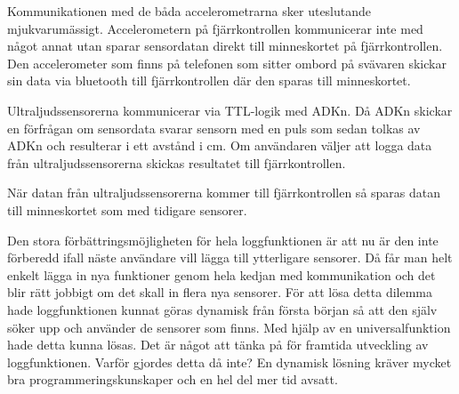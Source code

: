 Kommunikationen med de båda accelerometrarna sker uteslutande mjukvarumässigt. Accelerometern på fjärrkontrollen 
kommunicerar inte med något annat utan sparar sensordatan direkt till minneskortet på fjärrkontrollen. 
Den accelerometer som finns på telefonen som sitter ombord på svävaren skickar sin data via bluetooth till fjärrkontrollen 
där den sparas till minneskortet.

Ultraljudssensorerna kommunicerar via TTL-logik med ADKn. Då ADKn skickar en förfrågan om sensordata svarar sensorn med en puls som
sedan tolkas av ADKn och resulterar i ett avstånd i cm. Om användaren väljer att logga data från ultraljudssensorerna skickas
resultatet till fjärrkontrollen.

När datan från ultraljudssensorerna kommer till fjärrkontrollen så sparas datan till minneskortet som med tidigare sensorer.

Den stora förbättringsmöjligheten för hela loggfunktionen är att nu är den inte förberedd ifall näste användare vill lägga till ytterligare sensorer. 
Då får man helt enkelt lägga in nya funktioner genom hela kedjan med kommunikation och det blir rätt jobbigt om det skall in flera nya sensorer. 
För att lösa detta dilemma hade loggfunktionen kunnat göras dynamisk från första början så att den själv söker upp och använder de sensorer som finns. Med hjälp av en universalfunktion hade detta kunna lösas. Det är något att tänka på för framtida utveckling av loggfunktionen. Varför gjordes detta då inte? En dynamisk lösning kräver mycket bra programmeringskunskaper och en hel del mer tid avsatt. 
